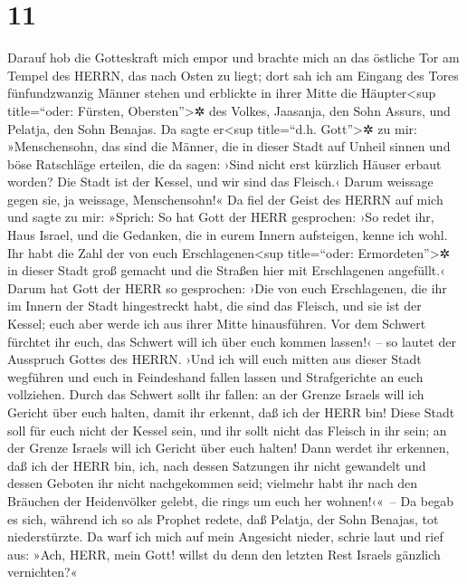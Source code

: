 \hypertarget{section-10}{%
\section{11}\label{section-10}}

Darauf hob die Gotteskraft mich empor und brachte mich an
das östliche Tor am Tempel des HERRN, das nach Osten zu liegt; dort sah
ich am Eingang des Tores fünfundzwanzig Männer stehen und erblickte in
ihrer Mitte die Häupter\textless sup title=``oder: Fürsten,
Obersten''\textgreater✲ des Volkes, Jaasanja, den Sohn Assurs, und
Pelatja, den Sohn Benajas. Da sagte er\textless sup
title=``d.h. Gott''\textgreater✲ zu mir: »Menschensohn, das sind die
Männer, die in dieser Stadt auf Unheil sinnen und böse Ratschläge
erteilen, die da sagen: ›Sind nicht erst kürzlich Häuser
erbaut worden? Die Stadt ist der Kessel, und wir sind das Fleisch.‹
Darum weissage gegen sie, ja weissage, Menschensohn!«
Da fiel der Geist des HERRN auf mich und sagte zu mir:
»Sprich: So hat Gott der HERR gesprochen: ›So redet ihr, Haus Israel,
und die Gedanken, die in eurem Innern aufsteigen, kenne ich wohl.
Ihr habt die Zahl der von euch Erschlagenen\textless sup
title=``oder: Ermordeten''\textgreater✲ in dieser Stadt groß gemacht und
die Straßen hier mit Erschlagenen angefüllt.‹ Darum hat
Gott der HERR so gesprochen: ›Die von euch Erschlagenen, die ihr im
Innern der Stadt hingestreckt habt, die sind das Fleisch, und sie ist
der Kessel; euch aber werde ich aus ihrer Mitte hinausführen.
Vor dem Schwert fürchtet ihr euch, das Schwert will ich
über euch kommen lassen!‹ -- so lautet der Ausspruch Gottes des HERRN.
›Und ich will euch mitten aus dieser Stadt wegführen und
euch in Feindeshand fallen lassen und Strafgerichte an euch vollziehen.
Durch das Schwert sollt ihr fallen: an der Grenze Israels
will ich Gericht über euch halten, damit ihr erkennt, daß ich der HERR
bin! Diese Stadt soll für euch nicht der Kessel sein, und
ihr sollt nicht das Fleisch in ihr sein; an der Grenze Israels will ich
Gericht über euch halten! Dann werdet ihr erkennen, daß
ich der HERR bin, ich, nach dessen Satzungen ihr nicht gewandelt und
dessen Geboten ihr nicht nachgekommen seid; vielmehr habt ihr nach den
Bräuchen der Heidenvölker gelebt, die rings um euch her wohnen!‹«~--
Da begab es sich, während ich so als Prophet redete, daß
Pelatja, der Sohn Benajas, tot niederstürzte. Da warf ich mich auf mein
Angesicht nieder, schrie laut und rief aus: »Ach, HERR, mein Gott!
willst du denn den letzten Rest Israels gänzlich vernichten?«

